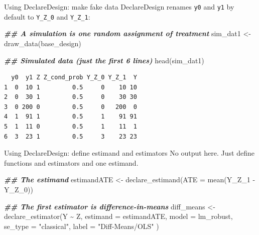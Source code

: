 \documentclass[
  ignorenonframetext,
]{beamer}
\newenvironment{Shaded}{\begin{snugshade}}{\end{snugshade}}
\newcommand{\AttributeTok}[1]{\textcolor[rgb]{0.77,0.63,0.00}{#1}}
\newcommand{\DocumentationTok}[1]{\textcolor[rgb]{0.56,0.35,0.01}{\textbf{\textit{#1}}}}
\newcommand{\FunctionTok}[1]{\textcolor[rgb]{0.00,0.00,0.00}{#1}}
\newcommand{\NormalTok}[1]{#1}
\newcommand{\OtherTok}[1]{\textcolor[rgb]{0.56,0.35,0.01}{#1}}
\newcommand{\SpecialCharTok}[1]{\textcolor[rgb]{0.00,0.00,0.00}{#1}}
\newcommand{\StringTok}[1]{\textcolor[rgb]{0.31,0.60,0.02}{#1}}
\begin{document}
\begin{frame}[fragile]{Using DeclareDesign: make fake data}
\protect\hypertarget{using-declaredesign-make-fake-data}{}
DeclareDesign renames \texttt{y0} and \texttt{y1} by default to
\texttt{Y\_Z\_0} and \texttt{Y\_Z\_1}:

\scriptsize

\begin{Shaded}
\begin{Highlighting}[]
\DocumentationTok{\#\# A simulation is one random assignment of treatment}
\NormalTok{sim\_dat1 }\OtherTok{\textless{}{-}} \FunctionTok{draw\_data}\NormalTok{(base\_design)}

\DocumentationTok{\#\# Simulated data (just the first 6 lines)}
\FunctionTok{head}\NormalTok{(sim\_dat1)}
\end{Highlighting}
\end{Shaded}

\begin{verbatim}
  y0  y1 Z Z_cond_prob Y_Z_0 Y_Z_1  Y
1  0  10 1         0.5     0    10 10
2  0  30 1         0.5     0    30 30
3  0 200 0         0.5     0   200  0
4  1  91 1         0.5     1    91 91
5  1  11 0         0.5     1    11  1
6  3  23 1         0.5     3    23 23
\end{verbatim}

\normalsize
\end{frame}

\begin{frame}[fragile]{Using DeclareDesign: define estimand and
estimators}
\protect\hypertarget{using-declaredesign-define-estimand-and-estimators}{}
No output here. Just define functions and estimators and one estimand.

\scriptsize

\begin{Shaded}
\begin{Highlighting}[]
\DocumentationTok{\#\# The estimand}
\NormalTok{estimandATE }\OtherTok{\textless{}{-}} \FunctionTok{declare\_estimand}\NormalTok{(}\AttributeTok{ATE =} \FunctionTok{mean}\NormalTok{(Y\_Z\_1 }\SpecialCharTok{{-}}\NormalTok{ Y\_Z\_0))}

\DocumentationTok{\#\# The first estimator is difference{-}in{-}means}
\NormalTok{diff\_means }\OtherTok{\textless{}{-}} \FunctionTok{declare\_estimator}\NormalTok{(Y }\SpecialCharTok{\textasciitilde{}}\NormalTok{ Z,}
  \AttributeTok{estimand =}\NormalTok{ estimandATE,}
  \AttributeTok{model =}\NormalTok{ lm\_robust, }\AttributeTok{se\_type =} \StringTok{"classical"}\NormalTok{, }\AttributeTok{label =} \StringTok{"Diff{-}Means/OLS"}
\NormalTok{)}
\end{Highlighting}
\end{Shaded}

\normalsize
\end{frame}
\end{document}
